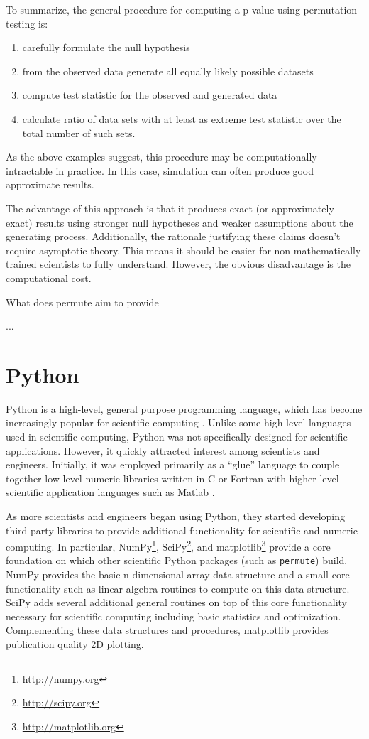 To summarize, the general procedure for computing a p-value using permutation
testing is:
\begin{enumerate}
\item carefully formulate the null hypothesis
\item from the observed data generate all equally likely possible datasets
\item compute test statistic for the observed and generated data
\item calculate ratio of data sets with at least as extreme test statistic over the total number of such sets.
\end{enumerate}
As the above examples suggest, this procedure may be computationally
intractable in practice.  In this case, simulation can often produce
good approximate results.

The advantage of this approach is that it produces exact (or approximately
exact) results using stronger null hypotheses and weaker assumptions about
the generating process. Additionally, the rationale justifying these claims
doesn't require asymptotic theory.  This means it should be easier for
non-mathematically trained scientists to fully understand.  However, the
obvious disadvantage is the computational cost.

What does permute aim to provide

...


\section{Python}

Python is a high-level, general purpose programming language, which has become
increasingly popular for scientific computing \cite{millman2011python,
Perez2011}. Unlike some high-level languages used in scientific computing,
Python was not specifically designed for scientific applications.  However, it
quickly attracted interest among scientists and engineers.  Initially, it was
employed primarily as a ``glue'' language to couple together low-level numeric
libraries written in C or Fortran with higher-level scientific application
languages such as Matlab \cite{dubois2007guest}.

As more scientists and engineers began using Python, they started developing
third party libraries to provide additional functionality for scientific
and numeric computing.  In particular, NumPy\footnote{\url{http://numpy.org}},
SciPy\footnote{\url{http://scipy.org}}, and matplotlib\footnote{
\url{http://matplotlib.org}} provide a core foundation on which other
scientific Python packages (such as \texttt{permute}) build. NumPy
provides the basic n-dimensional array data structure and a small core
functionality such as linear algebra routines to compute on this
data structure.  SciPy adds several additional general routines on top
of this core functionality necessary for scientific computing including
basic statistics and optimization.  Complementing these data structures
and procedures, matplotlib provides publication quality 2D plotting.  

